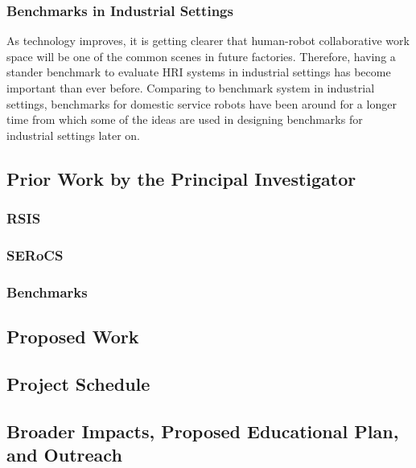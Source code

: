 \subsubsection{Benchmarks in Industrial Settings}

As technology improves, it is getting clearer that human-robot collaborative work space will be one of the common scenes in future factories. Therefore, having a stander benchmark to evaluate HRI systems in industrial settings has become important than ever before. Comparing to benchmark system in industrial settings, benchmarks for domestic service robots
have been around for a longer time \cite{wisspeintner2009robocup} from which some of the ideas are used in designing benchmarks for industrial settings later on.       

\subsection{Prior Work by the Principal Investigator}

\subsubsection{RSIS}

\subsubsection{SERoCS}

\subsubsection{Benchmarks}

\subsection{Proposed Work}







\subsection{Project Schedule}





\subsection{Broader Impacts, Proposed Educational Plan, and Outreach}

